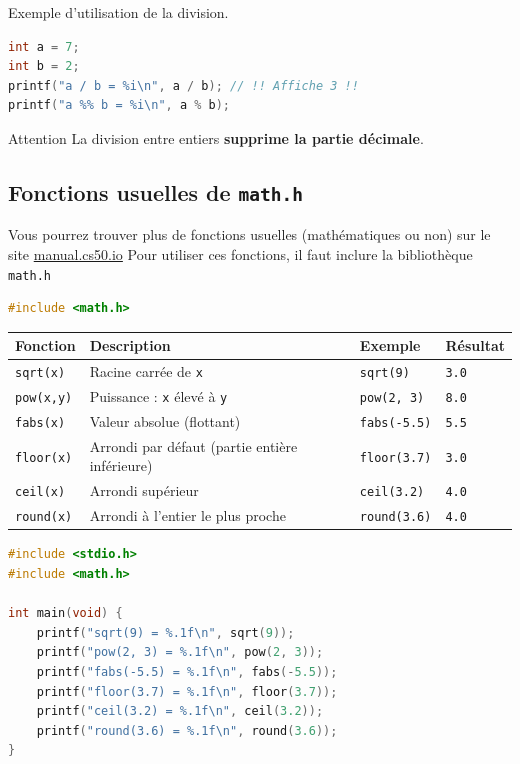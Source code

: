 \hfill
\begin{minipage}{0.55\textwidth}	
	Exemple d'utilisation de la division. 
	\begin{lstlisting}[language=c]
int a = 7;
int b = 2;
printf("a / b = %i\n", a / b); // !! Affiche 3 !!
printf("a %% b = %i\n", a % b);
	\end{lstlisting}
\end{minipage}
	
\begin{UPSTIwarning}{Attention}
	La division entre entiers \textbf{supprime la partie décimale}.
\end{UPSTIwarning}

\subsection{Fonctions usuelles de \texttt{math.h}}

Vous pourrez trouver plus de fonctions usuelles (mathématiques ou non) sur le site \href{https://manual.cs50.io/}{manual.cs50.io}
Pour utiliser ces fonctions, il faut inclure la bibliothèque \texttt{math.h}

\begin{lstlisting}[language=c]
#include <math.h>
\end{lstlisting}

\begin{center}
	\begin{tabular}{|l|l|l|l|}
		\hline
		Fonction          & Description                                    & Exemple             & Résultat     \\
		\hline
		\texttt{sqrt(x)}  & Racine carrée de \texttt{x}                    & \texttt{sqrt(9)}    & \texttt{3.0} \\
		\texttt{pow(x,y)} & Puissance : \texttt{x} élevé à \texttt{y}      & \texttt{pow(2, 3)}  & \texttt{8.0} \\
		\texttt{fabs(x)}  & Valeur absolue (flottant)                      & \texttt{fabs(-5.5)} & \texttt{5.5} \\
		\texttt{floor(x)} & Arrondi par défaut (partie entière inférieure) & \texttt{floor(3.7)} & \texttt{3.0} \\
		\texttt{ceil(x)}  & Arrondi supérieur                              & \texttt{ceil(3.2)}  & \texttt{4.0} \\
		\texttt{round(x)} & Arrondi à l’entier le plus proche              & \texttt{round(3.6)} & \texttt{4.0} \\
		\hline
	\end{tabular}
\end{center}
\begin{lstlisting}[language=c]
#include <stdio.h>
#include <math.h>

int main(void) {
    printf("sqrt(9) = %.1f\n", sqrt(9));
    printf("pow(2, 3) = %.1f\n", pow(2, 3));
    printf("fabs(-5.5) = %.1f\n", fabs(-5.5));
    printf("floor(3.7) = %.1f\n", floor(3.7));
    printf("ceil(3.2) = %.1f\n", ceil(3.2));
    printf("round(3.6) = %.1f\n", round(3.6));
}
\end{lstlisting}